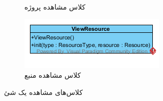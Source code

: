\begin{figure}[H]
\begin{subfigure}[b]{0.3\textwidth}
		\caption{کلاس مشاهده پروژه}
	\end{subfigure}
	\hfill
	\begin{subfigure}[b]{0.3\textwidth}
		\includegraphics[width=\textwidth]{img/class-design/ui/ViewResource.png}
		\caption{کلاس مشاهده منبع}
	\end{subfigure}
	\caption{کلاس‌های مشاهده یک شئ}
\end{figure}


